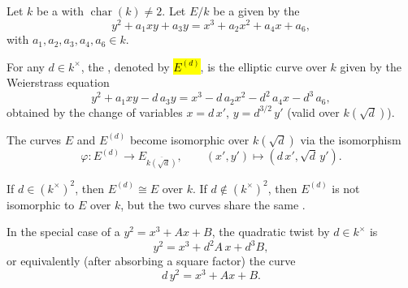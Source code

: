 \begin{definition} \label{definition:quadratic_twist_of_an_elliptic_curve_over_a_field}
Let $k$ be a  with $\operatorname{char}(k) \neq 2$. Let $E/k$ be a  given by the 
    $$ y^2 + a_1 x y + a_3 y = x^3 + a_2 x^2 + a_4 x + a_6, $$
    with $a_1, a_2, a_3, a_4, a_6 \in k$.

    For any $d \in k^\times$, the , denoted by \hl{$E^{(d)}$}, is the elliptic curve over $k$ given by the Weierstrass equation
    $$ y^2 + a_1 x y - d\, a_3 y = x^3 - d\, a_2 x^2 - d^2\, a_4 x - d^3\, a_6, $$
    obtained by the change of variables $x = d\, x'$, $y = d^{3/2}\, y'$ (valid over $k(\sqrt{d})$).

    The curves $E$ and $E^{(d)}$ become isomorphic over $k(\sqrt{d})$ via the isomorphism
    $$ \varphi: E^{(d)} \to E_{\overline{k(\sqrt{d})}}, \qquad (x', y') \mapsto (d\, x', \sqrt{d}\, y'). $$

    If $d \in (k^\times)^2$, then $E^{(d)} \cong E$ over $k$. If $d \notin (k^\times)^2$, then $E^{(d)}$ is not isomorphic to $E$ over $k$, but the two curves share the same .

    In the special case of a  $y^2 = x^3 + A x + B$, the quadratic twist by $d \in k^\times$ is
    $$ y^2 = x^3 + d^2 A\, x + d^3 B, $$
    or equivalently (after absorbing a square factor) the curve
    $$ d\, y^2 = x^3 + A x + B. $$
\end{definition}
